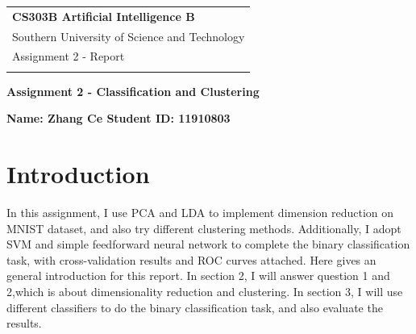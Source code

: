 \documentclass[a4paper,12pt]{article} %
\begin{document}



\thispagestyle{empty} %

\begin{tabular}{p{15.5cm}} %
{\large \bf CS303B Artificial Intelligence B} \\
Southern University of Science and Technology\\
Assignment 2 - Report \\
\hline %
\\
\end{tabular} %


\begin{center} %
	{\large \bf Assignment 2 - Classification and Clustering}\\ %
	\vspace{2mm}
	\begin{small}
	{\bf Name: Zhang Ce\:\:\:  Student ID: 11910803} %
	\end{small}
\end{center}



\vspace{3pt}
\tableofcontents

\newpage

\section{Introduction}
\hspace{0.7cm}
In this assignment, I use PCA and LDA to implement dimension reduction on MNIST dataset, and also try different clustering methods. Additionally, I adopt SVM and simple feedforward neural network to complete the binary classification task, with cross-validation results and ROC curves attached. Here gives an general introduction for this report. In section 2, I will answer question 1 and 2,which is about dimensionality reduction and clustering. In section 3, I will use different classifiers to do the binary classification task, and also evaluate the results.
\end{document}

